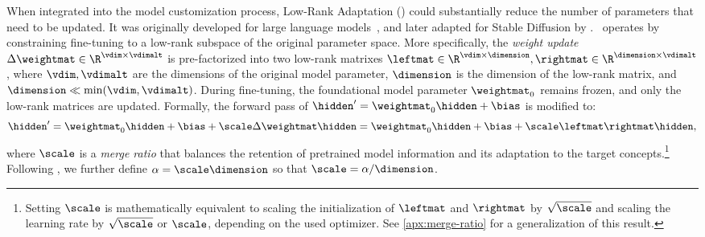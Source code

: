 %
When integrated into the model customization process, Low-Rank Adaptation (\lora) could substantially reduce the number of parameters that need to be updated. It was originally developed for large language models~\citep{hu2021lora}, and later adapted for Stable Diffusion by \cite{githublora}. 
\lora~operates by constraining fine-tuning to a low-rank subspace of the original parameter space.
More specifically, the \emph{weight update} $\Delta\weightmat \in \R^{\vdim\times \vdimalt}$ is pre-factorized into two low-rank matrixes $\leftmat \in \R^{\vdim\times \dimension}, \rightmat \in \R^{\dimension \times \vdimalt}$, where $\vdim, \vdimalt$ are the dimensions of the original model parameter, $\dimension$ is the dimension of the low-rank matrix, and $\dimension \ll \min(\vdim,\vdimalt)$. 
During fine-tuning, the foundational model parameter $\weightmat_{0}$ remains frozen, and only the low-rank matrices are updated.
Formally, the forward pass of $\hidden^{\prime} = \weightmat_{0}\hidden+\bias$ is modified to:
\begin{equation}\label{eq:lora}
\hidden^{\prime} = \weightmat_{0}\hidden +\bias + \scale \Delta \weightmat \hidden  =  \weightmat_{0}\hidden  +\bias+ \scale \leftmat\rightmat \hidden,
\end{equation}
where $\scale$ is a \emph{merge ratio} that balances the retention of pretrained model information and its adaptation to the target concepts.\footnote{Setting $\scale$ is mathematically equivalent to scaling the initialization of $\leftmat$ and $\rightmat$ by $\sqrt{\scale}$ and scaling the learning rate by $\sqrt{\scale}$ or $\scale$, depending on the used optimizer. See \cref{apx:merge-ratio} for a generalization of this result.}
Following \cite{hu2021lora}, we further define $\alpha=\scale\dimension$ so that $\scale=\alpha/\dimension$.

